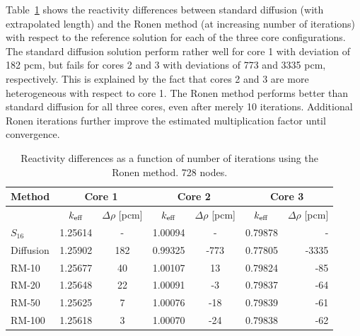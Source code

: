 Table~\ref{tab:dx_drho2} shows the reactivity differences between standard diffusion (with extrapolated length) and the Ronen method (at increasing number of iterations) with respect to the reference solution for each of the three core configurations. The standard diffusion solution perform rather well for core 1 with deviation of 182 pcm, but fails for cores 2 and 3 with deviations of 773 and 3335 pcm, respectively. This is explained by the fact that cores 2 and 3 are more heterogeneous with respect to core 1. The Ronen method performs better than standard diffusion for all three cores, even after merely 10 iterations. Additional Ronen iterations further improve the estimated multiplication factor until convergence.      

\begin{table}[!htbp]
	\centering
	\caption{Reactivity differences as a function of number of iterations using the Ronen method. 728 nodes.}
	\label{tab:dx_drho2}
	\begin{tabular}{lcccccr}
		Method & \multicolumn{2}{c}{Core 1} & \multicolumn{2}{c}{Core 2} & \multicolumn{2}{c}{Core 3}  \\ 
		\midrule
		{}				& ${k_{\textrm{\scriptsize{eff}}}}$& $\Delta\rho$ [pcm]& ${k_{\textrm{\scriptsize{eff}}}}$	&$\Delta\rho$ [pcm]& ${k_{\textrm{\scriptsize{eff}}}}$ &$\Delta\rho$ [pcm] \\
		$S_{16}$		&1.25614	&-			 &1.00094   &-				  &0.79878		&-		\\
		Diffusion		&1.25902	&182		 &0.99325	&-773			  &0.77805		&-3335	\\
		RM-10			&1.25677	&40			 &1.00107	&13			 	  &0.79824		&-85	\\
		RM-20			&1.25648	&22			 &1.00091	&-3			  	  &0.79837		&-64	\\
		RM-50			&1.25625	&7			 &1.00076	&-18			  &0.79839		&-61	\\
		RM-100			&1.25618	&3			 &1.00070	&-24			  &0.79838		&-62	\\		
	\end{tabular}
\end{table}

